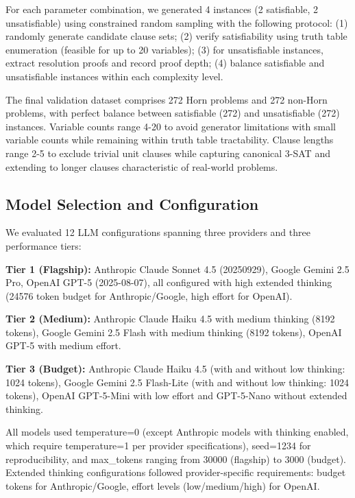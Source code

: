 \documentclass[pdflatex,sn-mathphys-num]{sn-jnl}%
\theoremstyle{thmstyleone}%
\theoremstyle{thmstyletwo}%
\theoremstyle{thmstylethree}%
\begin{document}
For each parameter combination, we generated 4 instances (2 satisfiable, 2 unsatisfiable) using constrained random sampling with the following protocol: (1) randomly generate candidate clause sets; (2) verify satisfiability using truth table enumeration (feasible for up to 20 variables); (3) for unsatisfiable instances, extract resolution proofs and record proof depth; (4) balance satisfiable and unsatisfiable instances within each complexity level.

The final validation dataset comprises 272 Horn problems and 272 non-Horn problems, with perfect balance between satisfiable (272) and unsatisfiable (272) instances. Variable counts range 4-20 to avoid generator limitations with small variable counts while remaining within truth table tractability. Clause lengths range 2-5 to exclude trivial unit clauses while capturing canonical 3-SAT and extending to longer clauses characteristic of real-world problems.

\subsection{Model Selection and Configuration}\label{subsec:models}

We evaluated 12 LLM configurations spanning three providers and three performance tiers:

\textbf{Tier 1 (Flagship):} Anthropic Claude Sonnet 4.5 (20250929), Google Gemini 2.5 Pro, OpenAI GPT-5 (2025-08-07), all configured with high extended thinking (24576 token budget for Anthropic/Google, high effort for OpenAI).

\textbf{Tier 2 (Medium):} Anthropic Claude Haiku 4.5 with medium thinking (8192 tokens), Google Gemini 2.5 Flash with medium thinking (8192 tokens), OpenAI GPT-5 with medium effort.

\textbf{Tier 3 (Budget):} Anthropic Claude Haiku 4.5 (with and without low thinking: 1024 tokens), Google Gemini 2.5 Flash-Lite (with and without low thinking: 1024 tokens), OpenAI GPT-5-Mini with low effort and GPT-5-Nano without extended thinking.

All models used temperature=0 (except Anthropic models with thinking enabled, which require temperature=1 per provider specifications), seed=1234 for reproducibility, and max\_tokens ranging from 30000 (flagship) to 3000 (budget). Extended thinking configurations followed provider-specific requirements: budget tokens for Anthropic/Google, effort levels (low/medium/high) for OpenAI.
\end{document}
